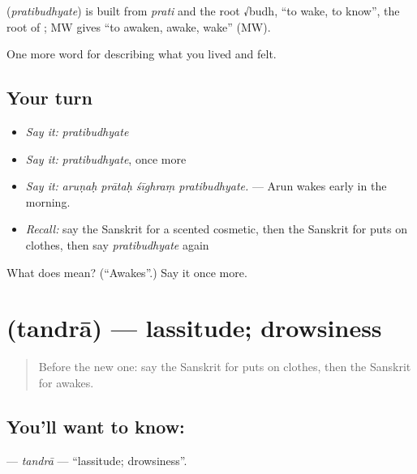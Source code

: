 \begin{cousinweb}
\textbf{} (\emph{pratibudhyate}) is built from \emph{prati} and the root √budh, \textquotedblleft{}to wake, to know\textquotedblright{}, the root of \textbf{}; MW gives \textquotedblleft{}to awaken, awake, wake\textquotedblright{} (MW).
\end{cousinweb}

\begin{grammarlens}[title={What you've built}]
One more word for describing what you lived and felt.
\end{grammarlens}

\subsection*{Your turn}
\begin{itemize}
\raggedright
  \item \emph{Say it:} \emph{pratibudhyate}
  \item \emph{Say it:} \emph{pratibudhyate}, once more
  \item \emph{Say it:} \emph{aruṇaḥ prātaḥ śīghraṃ pratibudhyate.} — Arun wakes early in the morning.
  \item \emph{Recall:} say the Sanskrit for a scented cosmetic, then the Sanskrit for puts on clothes, then say \emph{pratibudhyate} again
\end{itemize}

\begin{tcolorbox}[breakable,colback=teal!4,colframe=teal!35!black,title={Before you move on}]
What does  mean? (\textquotedblleft{}Awakes\textquotedblright{}.) Say it once more.
\end{tcolorbox}
\section[\texorpdfstring{\sk{तन्द्रा} (tandrā)}{तन्द्रा (tandrā)}]{ (tandrā) — lassitude; drowsiness}

\label{lesson:SA-C488-tandra}



\begin{quote}
Before the new one: say the Sanskrit for puts on clothes, then the Sanskrit for awakes.
\end{quote}

\subsection*{You'll want to know: }
\textbf{} — \emph{tandrā} — \textquotedblleft{}lassitude; drowsiness\textquotedblright{}.


